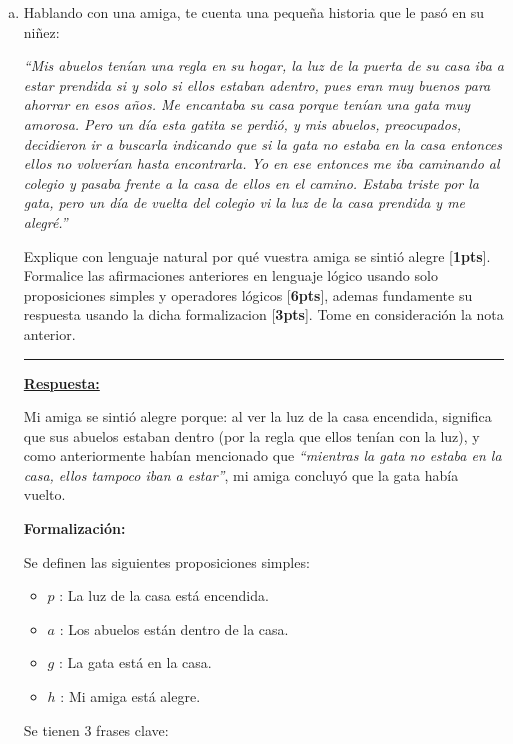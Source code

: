 \documentclass[legalpaper,10pt]{article}
\begin{document}
\begin{enumerate}[a)]
\item Hablando con una amiga, te cuenta una pequeña historia que le pasó en su
niñez:

\vspace{0.2cm}
\emph{ ``Mis abuelos tenían una regla en su hogar, la luz de la puerta de su casa iba a estar prendida si y solo si ellos estaban adentro, pues eran muy buenos para ahorrar en esos años. Me encantaba su casa porque tenían una gata muy amorosa. Pero un día esta gatita se perdió, y mis abuelos, preocupados, decidieron ir a buscarla indicando que si la gata no estaba en la casa entonces ellos no volverían hasta encontrarla. Yo en ese entonces me iba caminando al colegio y pasaba frente a la casa de ellos en el camino. Estaba triste por la gata, pero un día de vuelta del colegio vi la luz de la casa prendida y me alegré.''}

\vspace{0.2cm}
Explique con lenguaje natural por qué vuestra amiga se sintió alegre [\textbf{1pts}]. Formalice las afirmaciones anteriores en lenguaje lógico usando solo proposiciones simples y operadores lógicos [\textbf{6pts}], ademas fundamente su respuesta usando la dicha formalizacion [\textbf{3pts}]. Tome en consideración la nota anterior.

\rule{5cm}{0.4pt}

\underline{\textbf{Respuesta:}}

Mi amiga se sintió alegre porque: al ver la luz de la casa encendida, significa que sus abuelos estaban dentro (por la regla que ellos tenían con la luz), y como anteriormente habían mencionado que \textit{``mientras la gata no estaba en la casa, ellos tampoco iban a estar''}, mi amiga concluyó que la gata había vuelto.

\textbf{Formalización:}

Se definen las siguientes proposiciones simples:

\begin{itemize}
  \item \(p\) : La luz de la casa está encendida.
  \item \(a\) : Los abuelos están dentro de la casa.
  \item \(g\) : La gata está en la casa.
  \item \(h\) : Mi amiga está alegre.
\end{itemize}

Se tienen 3 frases clave:


\end{enumerate}
\end{document}
